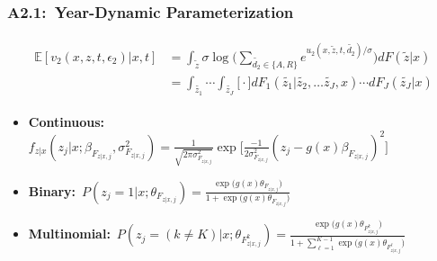 \documentclass[12pt, aspectratio=169]{beamer}
\begin{document}
\begin{frame}[label=ydp]
\frametitle{A2.1:\ Year-Dynamic Parameterization}
\begin{align*}
\begin{split}
\mathbb{E}[v_2(x,z,t,\epsilon_2)|x,t] &= \int_{\widetilde z}\sigma\log\bigg(\sum_{\widetilde{d_2}\in\{A,R\}}e^{u_2(x,\widetilde z,t,\widetilde{d_2})/\sigma}\bigg)dF(\widetilde z|x) \\
&= \int_{\widetilde{z_1}}\cdots\int_{\widetilde{z_J}}\bigg[\cdot\bigg]dF_1(\widetilde{z_1}|\widetilde{z_2},\dots\widetilde{z_J},x)\cdots dF_J(\widetilde{z_J}|x)
\end{split}
\end{align*}
\begin{itemize}
\item \textbf{Continuous:}\ $f_{z|x}(z_j|x;\beta_{F_{z|x,j}},\sigma^2_{F_{z|x,j}}) = \frac{1}{\sqrt{2\pi\sigma^2_{F_{z|x,j}}}}\exp\Big[\frac{-1}{2\sigma^2_{F_{z|x,j}}}(z_j-g(x)\beta_{F_{z|x,j}})^2\Big]$
\item \textbf{Binary:}\ $P(z_j=1|x;\theta_{F_{z|x,j}}) = \frac{\exp\big(g(x)\theta_{F_{z|x,j}}\big)}{1+\exp\big(g(x)\theta_{F_{z|x,j}}\big)}$
\vspace{-5pt}
\item \textbf{Multinomial:}\ $P(z_j=(k\neq K)|x;\theta_{F_{z|x,j}^k}) = \frac{\exp\Big(g(x)\theta_{F_{z|x,j}^k}\Big)}{1+\sum_{\ell=1}^{K-1}\exp\Big(g(x)\theta_{F_{z|x,j}^\ell}\Big)}$
\end{itemize}
\hyperlink{ydm}{}
\end{frame}
\end{document}

